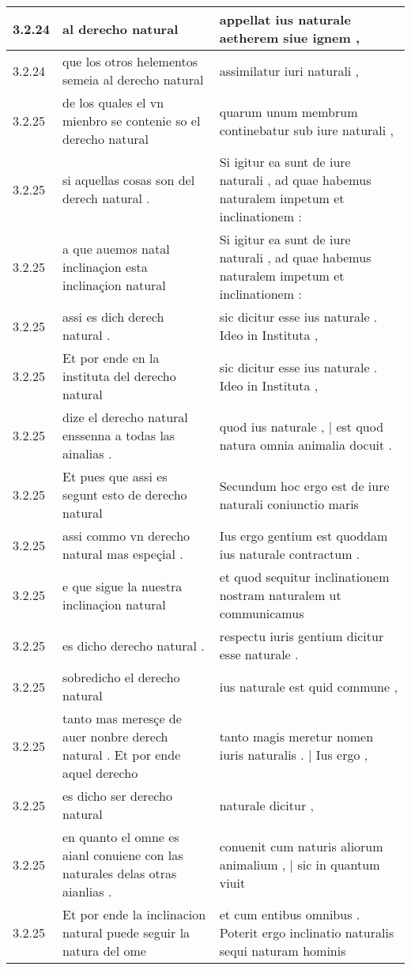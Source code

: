 \begin{tabular}{|p{1cm}|p{6.5cm}|p{6.5cm}|}
3.2.24 & al derecho natural & appellat ius naturale aetherem siue ignem , \\\hline
3.2.24 & que los otros helementos semeia al derecho natural & assimilatur iuri naturali , \\\hline
3.2.25 & de los quales el vn mienbro se contenie so el derecho natural & quarum unum membrum continebatur sub iure naturali , \\\hline
3.2.25 & si aquellas cosas son del derech natural . & Si igitur ea sunt de iure naturali , ad quae habemus naturalem impetum et inclinationem : \\\hline
3.2.25 & a que auemos natal inclinaçion esta inclinaçion natural & Si igitur ea sunt de iure naturali , ad quae habemus naturalem impetum et inclinationem : \\\hline
3.2.25 & assi es dich derech natural . & sic dicitur esse ius naturale . Ideo in Instituta , \\\hline
3.2.25 & Et por ende en la instituta del derecho natural & sic dicitur esse ius naturale . Ideo in Instituta , \\\hline
3.2.25 & dize el derecho natural enssenna a todas las ainalias . & quod ius naturale , | est quod natura omnia animalia docuit . \\\hline
3.2.25 & Et pues que assi es segunt esto de derecho natural & Secundum hoc ergo est de iure naturali coniunctio maris \\\hline
3.2.25 & assi commo vn derecho natural mas espeçial . & Ius ergo gentium est quoddam ius naturale contractum . \\\hline
3.2.25 & e que sigue la nuestra inclinaçion natural & et quod sequitur inclinationem nostram naturalem ut communicamus \\\hline
3.2.25 & es dicho derecho natural . & respectu iuris gentium dicitur esse naturale . \\\hline
3.2.25 & sobredicho el derecho natural & ius naturale est quid commune , \\\hline
3.2.25 & tanto mas meresçe de auer nonbre derech natural . Et por ende aquel derecho & tanto magis meretur nomen iuris naturalis . | Ius ergo , \\\hline
3.2.25 & es dicho ser derecho natural & naturale dicitur , \\\hline
3.2.25 & en quanto el omne es aianl conuiene con las naturales delas otras aianlias . & conuenit cum naturis aliorum animalium , | sic in quantum viuit \\\hline
3.2.25 & Et por ende la inclinacion natural puede seguir la natura del ome & et cum entibus omnibus . Poterit ergo inclinatio naturalis sequi naturam hominis \\\hline

\end{tabular}
